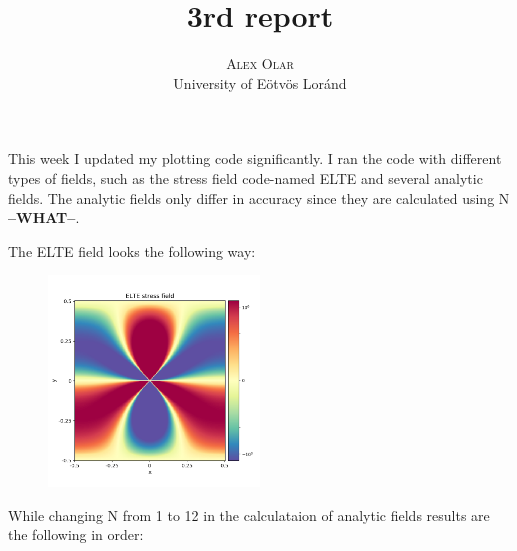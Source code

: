 \documentclass[12pt,a4paper]{article}
\title{\textbf{3rd report}}
\author{\Large{\textsc{Alex Olar}} \vspace{10pt}\\
	\textrm{University of Eötvös Loránd}
	}
\date{}
\theoremstyle{plain}
\begin{document}
\maketitle

\par This week I updated my plotting code significantly. I ran the code
with different types of fields, such as the stress field code-named ELTE and
several analytic fields. The analytic fields only differ in accuracy since they are
calculated using N \textbf{--WHAT--}.

\par The ELTE field looks the following way:

\begin{figure}[H]
	\centering
	\includegraphics[width=0.5\textwidth]{../elte_stress_field.png}
\end{figure}

\par While changing N from 1 to 12 in the calculataion of analytic fields results are the
following in order:

\vspace{1cm}
\end{document}
